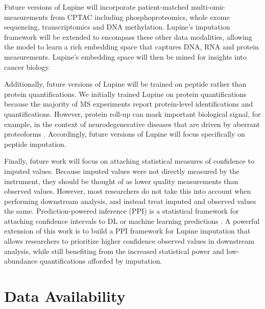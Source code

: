 \documentclass{article}
\begin{document}

Future versions of Lupine will incorporate patient-matched multi-omic measurements from CPTAC including phosphoproteomics, whole exome sequencing, transcriptomics and DNA methylation. Lupine’s imputation framework will be extended to encompass these other data modalities, allowing the model to learn a rich embedding space that captures DNA, RNA and protein measurements. Lupine’s embedding space will then be mined for insights into cancer biology. 

Additionally, future versions of Lupine will be trained on peptide rather than protein quantifications. We initially trained Lupine on protein quantifications because the majority of MS experiments report protein-level identifications and quantifications. However, protein roll-up can mask important biological signal, for example, in the context of neurodegenerative diseases that are driven by aberrant proteoforms \cite{humpty-dumpty, smtg-maccoss}. Accordingly, future versions of Lupine will focus specifically on peptide imputation. 

Finally, future work will focus on attaching statistical measures of confidence to imputed values. Because imputed values were not directly measured by the instrument, they should be thought of as lower quality measurements than observed values. However, most researchers do not take this into account when performing downstream analysis, and instead treat imputed and observed values the same. Prediction-powered inference (PPI) is a statistical framework for attaching confidence intervals to DL or machine learning predictions \cite{ppi-2023}. A powerful extension of this work is to build a PPI framework for Lupine imputation that allows researchers to prioritize higher confidence observed values in downstream analysis, while still benefiting from the increased statistical power and low-abundance quantifications afforded by imputation. 

\section*{Data Availability}
\end{document}
